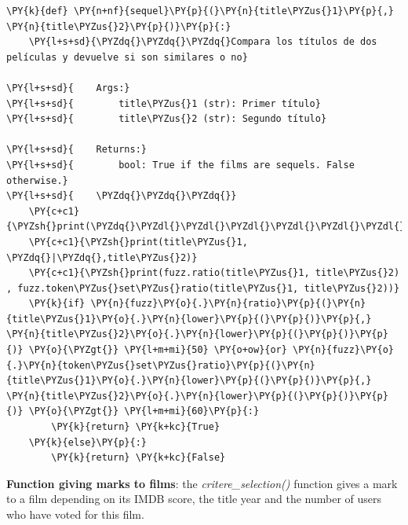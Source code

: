     \begin{tcolorbox}[breakable, size=fbox, boxrule=1pt, pad at break*=1mm,colback=cellbackground, colframe=cellborder]
\begin{Verbatim}[commandchars=\\\{\}]
\PY{k}{def} \PY{n+nf}{sequel}\PY{p}{(}\PY{n}{title\PYZus{}1}\PY{p}{,} \PY{n}{title\PYZus{}2}\PY{p}{)}\PY{p}{:}   
    \PY{l+s+sd}{\PYZdq{}\PYZdq{}\PYZdq{}Compara los títulos de dos películas y devuelve si son similares o no}

\PY{l+s+sd}{    Args:}
\PY{l+s+sd}{        title\PYZus{}1 (str): Primer título}
\PY{l+s+sd}{        title\PYZus{}2 (str): Segundo título}

\PY{l+s+sd}{    Returns:}
\PY{l+s+sd}{        bool: True if the films are sequels. False otherwise.}
\PY{l+s+sd}{    \PYZdq{}\PYZdq{}\PYZdq{}}
    \PY{c+c1}{\PYZsh{}print(\PYZdq{}\PYZdl{}\PYZdl{}\PYZdl{}\PYZdl{}\PYZdl{}\PYZdl{}\PYZdl{}\PYZdl{}\PYZdl{}\PYZdl{}\PYZdl{}\PYZdl{}\PYZdl{}\PYZdl{}\PYZdl{}\PYZdl{}\PYZdl{}\PYZdl{}\PYZdl{}\PYZdl{}\PYZdl{}\PYZdl{}\PYZdq{})}
    \PY{c+c1}{\PYZsh{}print(title\PYZus{}1, \PYZdq{}|\PYZdq{},title\PYZus{}2)}
    \PY{c+c1}{\PYZsh{}print(fuzz.ratio(title\PYZus{}1, title\PYZus{}2) , fuzz.token\PYZus{}set\PYZus{}ratio(title\PYZus{}1, title\PYZus{}2))}
    \PY{k}{if} \PY{n}{fuzz}\PY{o}{.}\PY{n}{ratio}\PY{p}{(}\PY{n}{title\PYZus{}1}\PY{o}{.}\PY{n}{lower}\PY{p}{(}\PY{p}{)}\PY{p}{,} \PY{n}{title\PYZus{}2}\PY{o}{.}\PY{n}{lower}\PY{p}{(}\PY{p}{)}\PY{p}{)} \PY{o}{\PYZgt{}} \PY{l+m+mi}{50} \PY{o+ow}{or} \PY{n}{fuzz}\PY{o}{.}\PY{n}{token\PYZus{}set\PYZus{}ratio}\PY{p}{(}\PY{n}{title\PYZus{}1}\PY{o}{.}\PY{n}{lower}\PY{p}{(}\PY{p}{)}\PY{p}{,} \PY{n}{title\PYZus{}2}\PY{o}{.}\PY{n}{lower}\PY{p}{(}\PY{p}{)}\PY{p}{)} \PY{o}{\PYZgt{}} \PY{l+m+mi}{60}\PY{p}{:}
        \PY{k}{return} \PY{k+kc}{True}
    \PY{k}{else}\PY{p}{:}
        \PY{k}{return} \PY{k+kc}{False}
\end{Verbatim}
\end{tcolorbox}

    \textbf{Function giving marks to films}: the \emph{critere\_selection()}
function gives a mark to a film depending on its IMDB score, the title
year and the number of users who have voted for this film.


